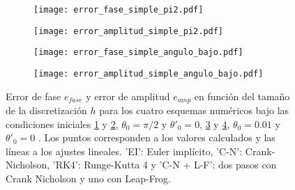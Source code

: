 \documentclass[aps,prb,twocolumn,superscriptaddress,floatfix,longbibliography]{revtex4-2}
\newcounter{para}
\begin{document}



\begin{figure}
  \centering
  \begin{subfigure}[b]{0.45\textwidth}
      \centering
      \texttt{[image: error\_fase\_simple\_pi2.pdf]}
      \caption{\label{fig:error_fase_simple_pi2}}
  \end{subfigure}
  \hfill
  \begin{subfigure}[b]{0.45\textwidth}
      \centering
      \texttt{[image: error\_amplitud\_simple\_pi2.pdf]}
      \caption{\label{fig:error_amplitud_simple_pi2}}
  \end{subfigure}
  \hfill
  \begin{subfigure}[b]{0.45\textwidth}
      \centering
      \texttt{[image: error\_fase\_simple\_angulo\_bajo.pdf]}
      \caption{\label{fig:error_fase_simple_angulo_bajo}}
  \end{subfigure}
  \hfill
  \begin{subfigure}[b]{0.45\textwidth}
      \centering
      \texttt{[image: error\_amplitud\_simple\_angulo\_bajo.pdf]}
      \caption{\label{fig:error_amplitud_simple_angulo_bajo}}
  \end{subfigure}
     \caption{Error de fase $e_{fase}$ y error de amplitud $e_{amp}$ en función del tamaño de la discretización $h$ para los cuatro esquemas numéricos bajo las condiciones iniciales \ref{fig:error_fase_simple_pi2} y \ref{fig:error_amplitud_simple_pi2}, $\theta_0 = \pi/2$ y $\theta'_0 = 0$, \ref{fig:error_fase_simple_angulo_bajo} y \ref{fig:error_amplitud_simple_angulo_bajo}, $\theta_0 = 0.01$ y $\theta'_0 = 0$ . Los puntos corresponden a los valores calculados y las líneas a los ajustes lineales. 'EI': Euler implícito, 'C-N': Crank-Nicholson, 'RK4': Runge-Kutta 4 y 'C-N + L-F': dos pasos con Crank Nicholson y uno con Leap-Frog.}
     \label{fig:simple_error_vs_h}
\end{figure}
\end{document}
